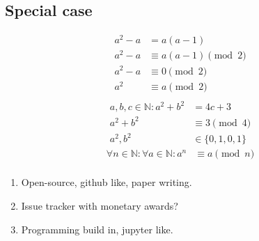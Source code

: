 \documentclass[a4paper,11pt]{article}
\theoremstyle{plain}
\theoremstyle{definition}
\newcommand{\N}{\mathbb{N}}
\begin{document}
\subsection{Special case}
\newpage
\begin{align*}
	a^2-a&=a(a-1)\\
	a^2-a&\equiv a(a-1) \pmod{2}\\
	a^2-a&\equiv 0 \pmod{2}\\
	a^2&\equiv a \pmod{2}\\
\end{align*}
\begin{align*}
	a,b,c\in\N: a^2+b^2&=4c+3\\
	a^2+b^2&\equiv 3 \pmod{4}\\
	a^2,b^2 &\in \{0,1,0,1\}
\end{align*}
\begin{align*}
	\forall n\in\N:\forall a\in\N: a^n &\equiv a \pmod{n}\\
\end{align*}
\begin{enumerate}
	\item Open-source, github like, paper writing.
	\item Issue tracker with monetary awards?
	\item Programming build in, jupyter like.
\end{enumerate}
\newpage
\end{document}
